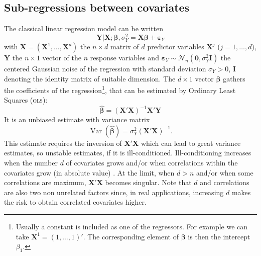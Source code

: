 \documentclass[11pt,a4paper]{article}
\begin{document}
\subsection{Sub-regressions between covariates}%
The classical linear regression model can be written
\begin{equation}
		\boldsymbol{Y}{|\boldsymbol{X}};\boldsymbol{\beta},\sigma_Y^2 = \boldsymbol{X}\boldsymbol{\beta} + \boldsymbol{\varepsilon}_Y \label{regressionsimple}
	\end{equation}
with $\boldsymbol{X}=(\boldsymbol{X}^1,\ldots,\boldsymbol{X}^d)$ the $n\times d$ matrix of $d$ predictor variables $\boldsymbol{X}^j$ ($j=1,\ldots,d$), $\boldsymbol{Y}$ the $n\times 1$ vector of the $n$ response variables and $\boldsymbol{\varepsilon}_Y \sim \mathcal{N}_n(\boldsymbol{0},\sigma_Y^2\boldsymbol{I})$ the centered Gaussian noise of the regression with standard deviation $\sigma_Y >0$, $\boldsymbol{I}$ denoting the identity matrix of suitable dimension. The $d\times 1$ vector $\boldsymbol{\beta}$ gathers the coefficients of the regression\footnote{Usually a constant is included as one of the regressors. For example we can take $\boldsymbol{X}^1=(1,\ldots,1)'$. The corresponding element of $\boldsymbol{\beta}$ is then the intercept $\beta_1$.}, that can be estimated by Ordinary Least Squares (\textsc{ols}): %
	\begin{equation}
		\hat{\boldsymbol{\beta}}=\left(\boldsymbol{X}'\boldsymbol{X} \right) ^{-1}\boldsymbol{X}'\boldsymbol{Y} \label{eq:OLS}
	\end{equation}
	It is an unbiased estimate with variance matrix
	\begin{equation}
		\operatorname{Var}(\hat{\boldsymbol{\beta}})=\sigma_Y^2\left(\boldsymbol{X}'\boldsymbol{X} \right) ^{-1}. \label{eq:varOLS}
	\end{equation}
	This estimate requires the inversion of $\boldsymbol{X}'\boldsymbol{X}$ which can lead to great variance estimates, so unstable estimates, if it is ill-conditioned. Ill-conditioning increases when the number $d$ of covariates grows and/or when correlations within the covariates grow (in absolute value)  \cite{hoerl1970ridge}. At the limit, when $d>n$ and/or when some correlations are maximum, $\boldsymbol{X}'\boldsymbol{X}$ becomes singular. Note that $d$ and correlations are also two non unrelated factors since, in real applications, increasing $d$ makes the risk to obtain correlated covariates higher.
	
\vspace{3mm}
\end{document}
